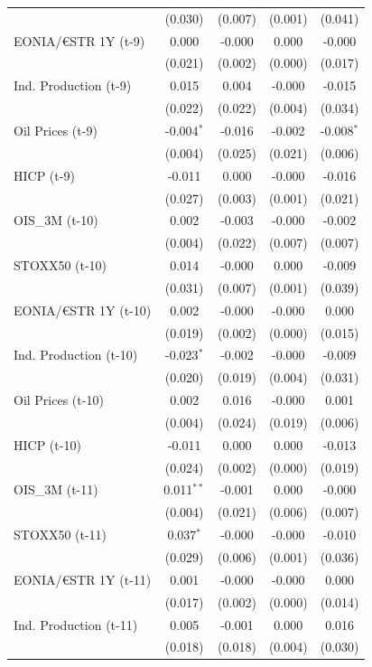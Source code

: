 \begin{longtable}[t]{lcccc}
 & (0.030) & (0.007) & (0.001) & (0.041)\\
EONIA/€STR 1Y (t-9) & 0.000 & -0.000 & 0.000 & -0.000\\
 & (0.021) & (0.002) & (0.000) & (0.017)\\
Ind. Production (t-9) & 0.015 & 0.004 & -0.000 & -0.015\\
 & (0.022) & (0.022) & (0.004) & (0.034)\\
Oil Prices (t-9) & -0.004$^{*}$ & -0.016 & -0.002 & -0.008$^{*}$\\
 & (0.004) & (0.025) & (0.021) & (0.006)\\
HICP (t-9) & -0.011 & 0.000 & -0.000 & -0.016\\
 & (0.027) & (0.003) & (0.001) & (0.021)\\
OIS\_3M (t-10) & 0.002 & -0.003 & -0.000 & -0.002\\
 & (0.004) & (0.022) & (0.007) & (0.007)\\
STOXX50 (t-10) & 0.014 & -0.000 & 0.000 & -0.009\\
 & (0.031) & (0.007) & (0.001) & (0.039)\\
EONIA/€STR 1Y (t-10) & 0.002 & -0.000 & -0.000 & 0.000\\
 & (0.019) & (0.002) & (0.000) & (0.015)\\
Ind. Production (t-10) & -0.023$^{*}$ & -0.002 & -0.000 & -0.009\\
 & (0.020) & (0.019) & (0.004) & (0.031)\\
Oil Prices (t-10) & 0.002 & 0.016 & -0.000 & 0.001\\
 & (0.004) & (0.024) & (0.019) & (0.006)\\
HICP (t-10) & -0.011 & 0.000 & 0.000 & -0.013\\
 & (0.024) & (0.002) & (0.000) & (0.019)\\
OIS\_3M (t-11) & 0.011$^{**}$ & -0.001 & 0.000 & -0.000\\
 & (0.004) & (0.021) & (0.006) & \vphantom{1} (0.007)\\
STOXX50 (t-11) & 0.037$^{*}$ & -0.000 & -0.000 & -0.010\\
 & (0.029) & (0.006) & (0.001) & (0.036)\\
EONIA/€STR 1Y (t-11) & 0.001 & -0.000 & -0.000 & 0.000\\
 & (0.017) & (0.002) & (0.000) & (0.014)\\
Ind. Production (t-11) & 0.005 & -0.001 & 0.000 & 0.016\\
 & (0.018) & (0.018) & (0.004) & (0.030)\\

\end{longtable}
